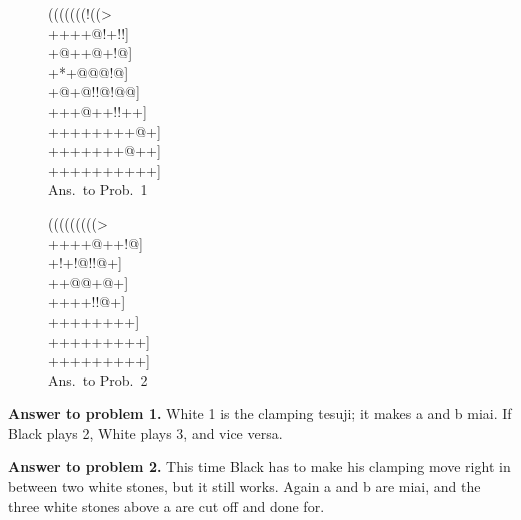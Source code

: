 \documentclass[mcrownvopaper,10pt,twopage,onecolumn,draft,showtrims]{memoir}
\begin{document}
\begin{figure}[ht]
    \begin{minipage}[c]{0.50\linewidth}
        \centering    
        {\gnos%
        (((((((!((>\\
        ++++{\gnosw{}}@!+!!]\\
        +@++{\gnosw{}}{\gnosb{}}@+!@]\\
        +*+@@@!@]\\
        +@+@!!@!@@]\\
        +++@++!!++]\\
        ++++++++@+]\\
        +++++++@++]\\
        ++++++++++]\\
        }
        Ans.\ to Prob.\ 1
    \end{minipage}%
    \begin{minipage}[c]{0.50\linewidth}
        \centering    
                {\gnos%
        (((((((((>\\
        ++++@++!@]\\
        +!+!@!!@+]\\
        ++@@+@+]\\
        ++++!{\gnosb{}}!@+]\\
        ++++++++]\\
        +++++++++]\\
        +++++++++]\\
        }
        Ans.\ to Prob.\ 2
    \end{minipage}%
\end{figure}  
\noindent
\textbf{Answer to problem 1.} White 1 is the clamping tesuji; it makes a and b
miai. If Black plays 2, White plays 3, and vice versa.

\noindent
\textbf{Answer to problem 2.} This time Black has to make his clamping move
right in between two white stones, but it still works. Again a and b are
miai, and the three white stones above a are cut off and done for.
\end{document}
